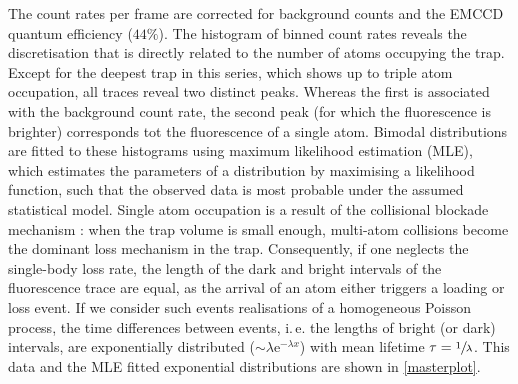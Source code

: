 \documentclass[../Thesis-IJspeert.tex]{subfiles}
\begin{document}
The count rates per frame are corrected for background counts and the EMCCD quantum efficiency ($44\%$). The histogram of binned count rates reveals the discretisation that is directly related to the number of atoms occupying the trap. Except for the deepest trap in this series, which shows up to triple atom occupation, all traces reveal two distinct peaks. Whereas the first is associated with the background count rate, the second peak (for which the fluorescence is brighter) corresponds tot the fluorescence of a single atom. Bimodal distributions are fitted to these histograms using maximum likelihood estimation (MLE), which estimates the parameters of a distribution by maximising a likelihood function, such that the observed data is most probable under the assumed statistical model. Single atom occupation is a result of the collisional blockade mechanism \cite{Schlosser2002}: when the trap volume is small enough, multi-atom collisions become the dominant loss mechanism in the trap. Consequently, if one neglects the single-body loss rate, the length of the dark and bright intervals of the fluorescence trace are equal, as the arrival of an atom either triggers a loading or loss event. If we consider such events realisations of a homogeneous Poisson process, the time differences between events, i.\,e. the lengths of bright (or dark) intervals, are exponentially distributed ($\sim\lambda \mathrm{e}^{-\lambda x}$) with mean lifetime $\tau=\sfrac{1}{\lambda}$. This data and the MLE fitted exponential distributions are shown in \autoref{masterplot}.
\end{document}
